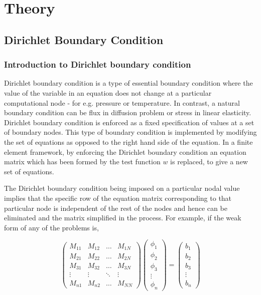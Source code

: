 \section{Theory}

\subsection{Dirichlet Boundary Condition}

\subsubsection{Introduction to Dirichlet boundary condition}

Dirichlet boundary condition is a type of essential boundary condition where the value of the variable in an equation 
does not change at a particular computational node - for e.g. pressure or temperature. 
In contrast, a natural boundary condition can be flux in diffusion problem or stress in linear elasticity. 
Dirichlet boundary condition is enforced as a fixed specification of values at a set of boundary nodes. 
This type of boundary condition is implemented by modifying the set of equations as opposed to the right hand side of the equation.
 In a finite element framework, by enforcing the Dirichlet boundary condition an equation matrix which has been formed 
by the test function $w$ is replaced, to give a new set of equations.

The Dirichlet boundary condition being imposed on a particular nodal value implies that the specific row 
of the equation matrix corresponding to that particular node is independent of the rest of the nodes and hence can
 be eliminated and the matrix simplified in the process. For example, if the weak form of any of the problems is,



\[ \left( \begin{array}{cccc}
M_{11} & M_{12} & \hdots& M_{1N} \\
M_{21} & M_{22} & \hdots& M_{2N} \\
M_{31} & M_{32} & \hdots& M_{3N} \\
 \vdots& \vdots& \ddots& \vdots\\
M_{n1} & M_{n2} & \hdots & M_{NN} \end{array} \right) \left( \begin{array}{c}
\phi_{1} \\
\phi_{2} \\
\phi_{3} \\
 \vdots\\ 
\phi_{n} \end{array} \right) = \left( \begin{array}{c}
b_{1} \\
b_{2} \\
b_{3} \\
 \vdots\\
b_{n} \end{array} \right) \] 



